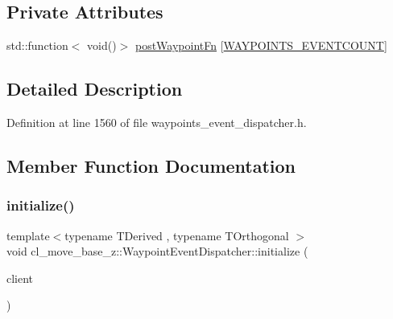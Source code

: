 \subsection*{Private Attributes}
\begin{DoxyCompactItemize}
\item 
std\+::function$<$ void()$>$ \hyperlink{classcl__move__base__z_1_1WaypointEventDispatcher_a964a57fcce5d48ec60243230722d8dd7}{post\+Waypoint\+Fn} \mbox{[}\hyperlink{waypoints__event__dispatcher_8h_add4ce0c5d955be6047a4820c63e7df08}{W\+A\+Y\+P\+O\+I\+N\+T\+S\+\_\+\+E\+V\+E\+N\+T\+C\+O\+U\+NT}\mbox{]}
\end{DoxyCompactItemize}


\subsection{Detailed Description}


Definition at line 1560 of file waypoints\+\_\+event\+\_\+dispatcher.\+h.



\subsection{Member Function Documentation}
\mbox{\label{classcl__move__base__z_1_1WaypointEventDispatcher_a89674461d32af85dd64ca49290dbd010}} 
\subsubsection{\texorpdfstring{initialize()}{initialize()}}
{\footnotesize\ttfamily template$<$typename T\+Derived , typename T\+Orthogonal $>$ \\
void cl\+\_\+move\+\_\+base\+\_\+z\+::\+Waypoint\+Event\+Dispatcher\+::initialize (\begin{DoxyParamCaption}\item[{\hyperlink{classcl__move__base__z_1_1ClMoveBaseZ}{Cl\+Move\+BaseZ} $\ast$}]{client }\end{DoxyParamCaption})}




